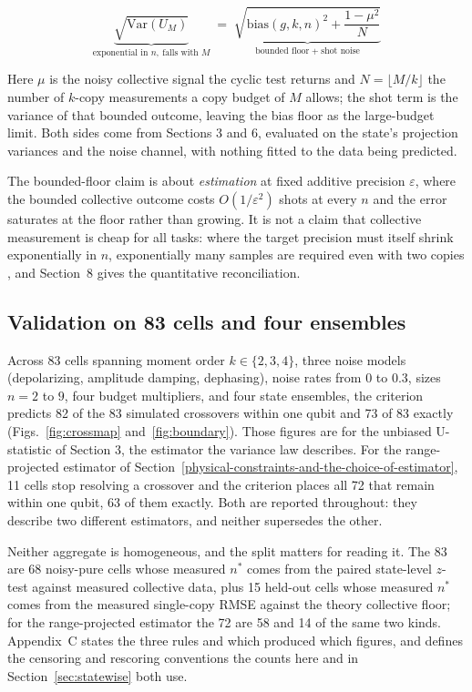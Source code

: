 \documentclass[a4paper,superscriptaddress,nofootinbib,onecolumn,nopdfoutputerror]{quantumarticle}
\begin{document}
\[\underbrace{\sqrt{\mathrm{Var}(U_M)}}_{\text{exponential in } n,\ \text{falls with } M} \;=\; \underbrace{\sqrt{\text{bias}(g, k, n)^2 + \frac{1 - \mu^2}{N}}}_{\text{bounded floor}\;+\;\text{shot noise}}\]

Here \(\mu\) is the noisy collective signal the cyclic test returns and
\(N = \lfloor M/k \rfloor\) the number of \(k\)-copy measurements a copy
budget of \(M\) allows; the shot term is the variance of that bounded outcome,
leaving the bias floor as the large-budget limit. Both sides come from
Sections 3 and 6, evaluated on the state's projection variances and the noise
channel, with nothing fitted to the data being predicted.

The bounded-floor claim is about \emph{estimation} at fixed additive
precision \(\varepsilon\), where the bounded collective outcome costs
\(O(1/\varepsilon^2)\) shots at every \(n\) and the error saturates at the
floor rather than growing. It is not a claim that collective measurement is
cheap for all tasks: where the target precision must itself shrink exponentially
in \(n\), exponentially many samples are required even with two copies
\cite{noisylearning2026}, and Section~8 gives the quantitative reconciliation.

\hypertarget{validation-on-83-cells-and-four-ensembles}{%
\subsection{Validation on 83 cells and four
ensembles}\label{validation-on-83-cells-and-four-ensembles}}

Across 83 cells spanning moment order \(k \in \{2,3,4\}\), three noise
models (depolarizing, amplitude damping, dephasing), noise rates from 0 to
0.3, sizes \(n = 2\) to \(9\), four budget multipliers, and four state
ensembles, the criterion predicts 82 of the 83 simulated crossovers within
one qubit and 73 of 83 exactly (Figs.~\ref{fig:crossmap}
and~\ref{fig:boundary}). Those figures are for the unbiased U-statistic of
Section 3, the estimator the variance law describes. For the range-projected
estimator of Section~\ref{physical-constraints-and-the-choice-of-estimator},
11 cells stop resolving a crossover and the criterion places all 72 that
remain within one qubit, 63 of them exactly. Both are reported throughout:
they describe two different estimators, and neither supersedes the other.

Neither aggregate is homogeneous, and the split matters for reading it. The
83 are 68 noisy-pure cells whose measured \(n^*\) comes from the paired
state-level \(z\)-test against measured collective data, plus 15 held-out
cells whose measured \(n^*\) comes from the measured single-copy RMSE
against the theory collective floor; for the range-projected estimator the
72 are 58 and 14 of the same two kinds. Appendix~C states the three rules
and which produced which figures, and defines the censoring and rescoring
conventions the counts here and in Section~\ref{sec:statewise} both use.
\end{document}
